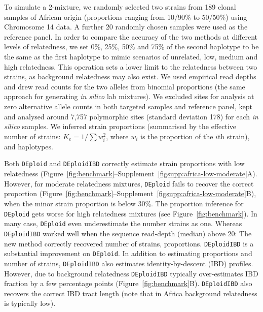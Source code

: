\documentclass[9pt]{article}
\begin{document}
To simulate a 2-mixture, we randomly selected two strains from 189 clonal samples of African origin (proportions ranging from 10/90\% to 50/50\%) using Chromosome 14 data.  A further 20 randomly chosen samples were used as the reference panel. In order to compare the accuracy of the two methods at different levels of relatedness, we set 0\%, 25\%, 50\% and 75\% of the second haplotype to be the same as the first haplotype to mimic scenarios of unrelated, low, medium and high relatedness. This operation sets a lower limit to the relatedness between two strains, as background relatedness may also exist. We used empirical read depths and drew read counts for the two alleles from binomial proportions (the same approach for generating {\it in silico} lab mixtures).
We excluded sites for analysis at zero alternative allele counts in both targeted samples and reference panel, kept and analysed around 7,757 polymorphic sites (standard deviation 178) for each {\it in silico} samples.
We inferred strain proportions (summarised by the effective number of strains: $K_e = 1/\sum w_{i}^{2}$, where $w_i$ is the proportion of the $i$th strain), and haplotypes.

Both \texttt{DEploid} and \texttt{DEploidIBD} correctly estimate strain proportions with low relatedness (Figure~\ref{fig:benchmark}--Supplement~\ref{figsupp:africa-low-moderate}A). However, for moderate relatedness mixtures, \texttt{DEploid} fails to recover the correct proportion (Figure~\ref{fig:benchmark}--Supplement~\ref*{figsupp:africa-low-moderate}B), when the minor strain proportion is below 30\%. The proportion inference for \texttt{DEploid} gets worse for high relatedness mixtures (see Figure~\ref*{fig:benchmark}). In many case, \texttt{DEploid} even underestimate the number strains as one. Whereas \texttt{DEploidIBD} worked well when the sequence read-depth (median) above 20: The new method correctly recovered number of strains, proportions. \texttt{DEploidIBD} is a substantial improvement on \texttt{DEploid}. In addition to estimating proportions and number of strains, \texttt{DEploidIBD} also estimates identity-by-descent (IBD) profiles. However, due to background relatedness {\tt DEploidIBD} typically over-estimates IBD fraction by a few percentage points (Figure~\ref{fig:benchmark}B). \texttt{DEploidIBD} also recovers the correct IBD tract length (note that in Africa background relatedness is typically low).
\end{document}
